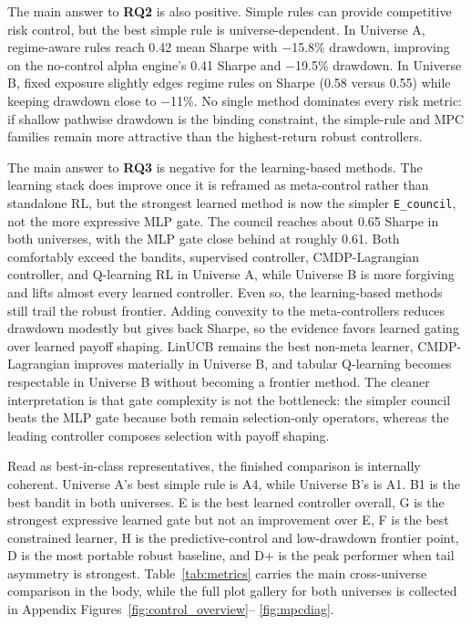 \documentclass[10pt,twocolumn]{article}
\begin{document}
The main answer to \textbf{RQ2} is also positive. Simple rules can provide
competitive risk control, but the best simple rule is universe-dependent. In
Universe A, regime-aware rules reach 0.42 mean Sharpe with $-$15.8\% drawdown,
improving on the no-control alpha engine's 0.41 Sharpe and $-$19.5\% drawdown.
In Universe B, fixed exposure slightly edges regime rules on Sharpe
(0.58 versus 0.55) while keeping drawdown close to $-$11\%. No single method
dominates every risk metric: if shallow pathwise drawdown is the binding
constraint, the simple-rule and MPC families remain more attractive than the
highest-return robust controllers.

The main answer to \textbf{RQ3} is negative for the learning-based methods.
The learning stack does improve once it is reframed as meta-control rather than
standalone RL, but the strongest learned method is now the simpler
\texttt{E\_council}, not the more expressive MLP gate. The council reaches
about 0.65 Sharpe in both universes, with the MLP gate close behind at roughly
0.61. Both comfortably exceed the bandits, supervised controller,
CMDP-Lagrangian controller, and Q-learning RL in Universe A, while Universe B
is more forgiving and lifts almost every learned controller. Even so, the
learning-based methods still trail the robust frontier. Adding convexity to the
meta-controllers reduces drawdown modestly but gives back Sharpe, so the
evidence favors learned gating over learned payoff shaping. LinUCB remains the
best non-meta learner, CMDP-Lagrangian improves materially in Universe B, and
tabular Q-learning becomes respectable in Universe B without becoming a frontier
method. The cleaner interpretation is that gate complexity is not the
bottleneck: the simpler council beats the MLP gate because both remain
selection-only operators, whereas the leading controller composes selection
with payoff shaping.

Read as best-in-class representatives, the finished comparison is internally
coherent. Universe A's best simple rule is A4, while Universe B's is A1. B1 is
the best bandit in both universes. E is the best learned controller overall, G
is the strongest expressive learned gate but not an improvement over E, F is
the best constrained learner, H is the predictive-control and low-drawdown
frontier point, D is the most portable robust baseline, and D+ is the peak
performer when tail asymmetry is strongest. Table~\ref{tab:metrics} carries
the main cross-universe comparison in the body, while the full plot gallery for
both universes is collected in Appendix Figures~\ref{fig:control_overview}--
\ref{fig:mpcdiag}.
\end{document}
